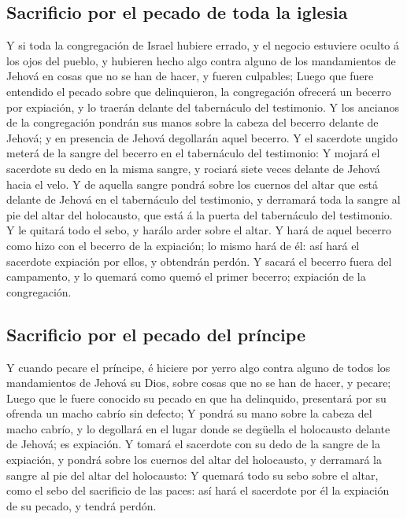 \hypertarget{sacrificio-por-el-pecado-de-toda-la-iglesia}{%
\subsection{Sacrificio por el pecado de toda la
iglesia}\label{sacrificio-por-el-pecado-de-toda-la-iglesia}}

 Y si toda la congregación de Israel hubiere errado, y el
negocio estuviere oculto á los ojos del pueblo, y hubieren hecho algo
contra alguno de los mandamientos de Jehová en cosas que no se han de
hacer, y fueren culpables;  Luego que fuere entendido el
pecado sobre que delinquieron, la congregación ofrecerá un becerro por
expiación, y lo traerán delante del tabernáculo del testimonio.
 Y los ancianos de la congregación pondrán sus manos sobre
la cabeza del becerro delante de Jehová; y en presencia de Jehová
degollarán aquel becerro.  Y el sacerdote ungido meterá de
la sangre del becerro en el tabernáculo del testimonio:  Y
mojará el sacerdote su dedo en la misma sangre, y rociará siete veces
delante de Jehová hacia el velo.  Y de aquella sangre
pondrá sobre los cuernos del altar que está delante de Jehová en el
tabernáculo del testimonio, y derramará toda la sangre al pie del altar
del holocausto, que está á la puerta del tabernáculo del testimonio.
 Y le quitará todo el sebo, y harálo arder sobre el altar.
 Y hará de aquel becerro como hizo con el becerro de la
expiación; lo mismo hará de él: así hará el sacerdote expiación por
ellos, y obtendrán perdón.  Y sacará el becerro fuera del
campamento, y lo quemará como quemó el primer becerro; expiación de la
congregación.

\hypertarget{sacrificio-por-el-pecado-del-pruxedncipe}{%
\subsection{Sacrificio por el pecado del
príncipe}\label{sacrificio-por-el-pecado-del-pruxedncipe}}

 Y cuando pecare el príncipe, é hiciere por yerro algo
contra alguno de todos los mandamientos de Jehová su Dios, sobre cosas
que no se han de hacer, y pecare;  Luego que le fuere
conocido su pecado en que ha delinquido, presentará por su ofrenda un
macho cabrío sin defecto;  Y pondrá su mano sobre la cabeza
del macho cabrío, y lo degollará en el lugar donde se degüella el
holocausto delante de Jehová; es expiación.  Y tomará el
sacerdote con su dedo de la sangre de la expiación, y pondrá sobre los
cuernos del altar del holocausto, y derramará la sangre al pie del altar
del holocausto:  Y quemará todo su sebo sobre el altar,
como el sebo del sacrificio de las paces: así hará el sacerdote por él
la expiación de su pecado, y tendrá perdón.

